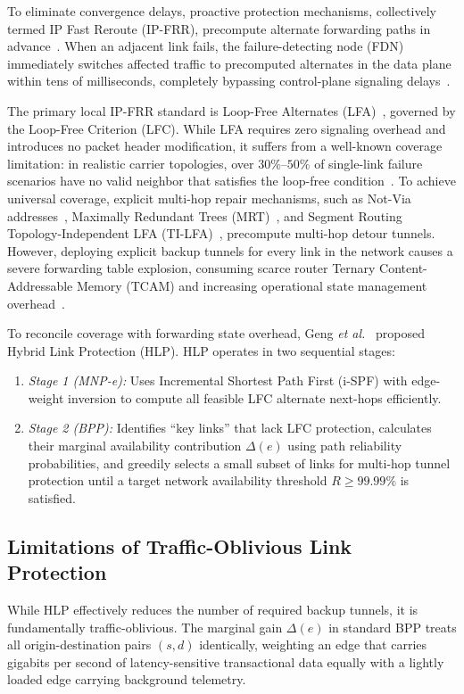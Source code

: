 \documentclass[journal]{IEEEtran}
\begin{document}
To eliminate convergence delays, proactive protection mechanisms, collectively termed IP Fast Reroute (IP-FRR), precompute alternate forwarding paths in advance~\cite{rfc5714,merling2021rolps,verdi2023infarr}. When an adjacent link fails, the failure-detecting node (FDN) immediately switches affected traffic to precomputed alternates in the data plane within tens of milliseconds, completely bypassing control-plane signaling delays~\cite{li2012unified}. 

The primary local IP-FRR standard is Loop-Free Alternates (LFA)~\cite{rfc5286}, governed by the Loop-Free Criterion (LFC). While LFA requires zero signaling overhead and introduces no packet header modification, it suffers from a well-known coverage limitation: in realistic carrier topologies, over $30\%\text{--}50\%$ of single-link failure scenarios have no valid neighbor that satisfies the loop-free condition~\cite{rfc7490,merindol2011efficient}. To achieve universal coverage, explicit multi-hop repair mechanisms, such as Not-Via addresses~\cite{rfc6981}, Maximally Redundant Trees (MRT)~\cite{rfc7812}, and Segment Routing Topology-Independent LFA (TI-LFA)~\cite{rfc9855}, precompute multi-hop detour tunnels. However, deploying explicit backup tunnels for every link in the network causes a severe forwarding table explosion, consuming scarce router Ternary Content-Addressable Memory (TCAM) and increasing operational state management overhead~\cite{bramas2025simple}.

To reconcile coverage with forwarding state overhead, Geng \textit{et al.}~\cite{geng2020hybrid} proposed Hybrid Link Protection (HLP). HLP operates in two sequential stages:
\begin{enumerate}
    \item \textit{Stage 1 (MNP-e):} Uses Incremental Shortest Path First (i-SPF) with edge-weight inversion to compute all feasible LFC alternate next-hops efficiently.
    \item \textit{Stage 2 (BPP):} Identifies ``key links'' that lack LFC protection, calculates their marginal availability contribution $\Delta(e)$ using path reliability probabilities, and greedily selects a small subset of links for multi-hop tunnel protection until a target network availability threshold $R \ge 99.99\%$ is satisfied.
\end{enumerate}

\subsection{Limitations of Traffic-Oblivious Link Protection}
While HLP effectively reduces the number of required backup tunnels, it is fundamentally traffic-oblivious. The marginal gain $\Delta(e)$ in standard BPP treats all origin-destination pairs $(s, d)$ identically, weighting an edge that carries gigabits per second of latency-sensitive transactional data equally with a lightly loaded edge carrying background telemetry.
\end{document}
